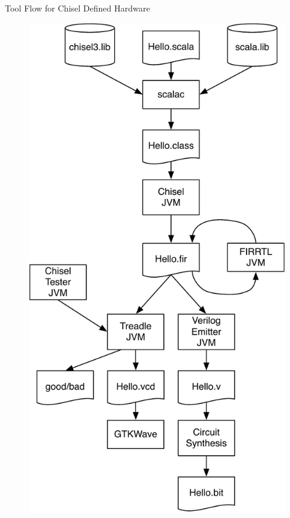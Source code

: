 \begin{frame}[fragile]{Tool Flow for Chisel Defined Hardware}
\begin{figure}
    \centering
    \includegraphics[scale=0.35]{../figures/flow}
\end{figure}
\end{frame}

